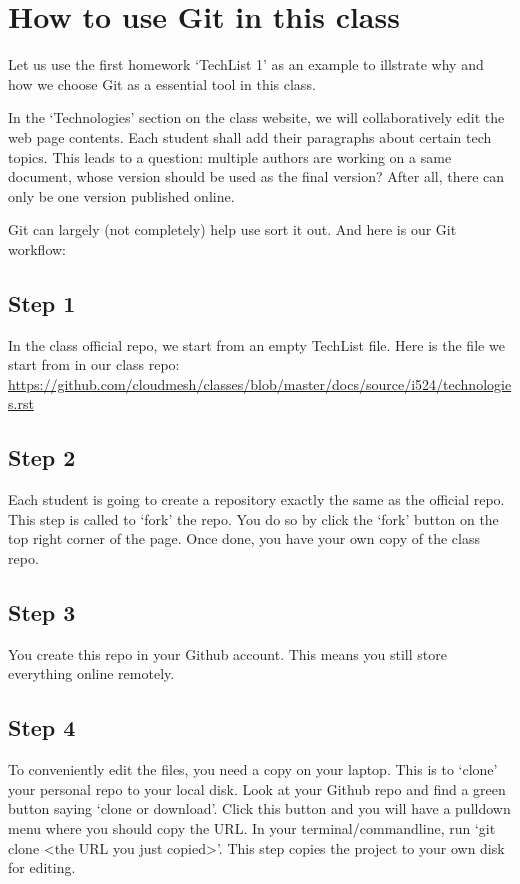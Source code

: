 \section{How to use Git in this class}\label{how-to-use-git-in-this-class}

Let us use the first homework `TechList 1' as an example to illstrate
why and how we choose Git as a essential tool in this class.

In the `Technologies' section on the class website, we will
collaboratively edit the web page contents. Each student shall add their
paragraphs about certain tech topics. This leads to a question: multiple
authors are working on a same document, whose version should be used as
the final version? After all, there can only be one version published
online.

Git can largely (not completely) help use sort it out. And here is our
Git workflow:

\subsection{Step 1}\label{step-1}

In the class official repo, we start from an empty TechList file. Here
is the file we start from in our class repo:
\url{https://github.com/cloudmesh/classes/blob/master/docs/source/i524/technologies.rst}

\subsection{Step 2}\label{step-2}

Each student is going to create a repository exactly the same as the
official repo. This step is called to `fork' the repo. You do so by
click the `fork' button on the top right corner of the page. Once done,
you have your own copy of the class repo.

\subsection{Step 3}\label{step-3}

You create this repo in your Github account. This means you still store
everything online remotely.

\subsection{Step 4}\label{step-4}

To conveniently edit the files, you need a copy on your laptop. This is
to `clone' your personal repo to your local disk. Look at your Github
repo and find a green button saying `clone or download'. Click this
button and you will have a pulldown menu where you should copy the URL.
In your terminal/commandline, run `git clone \textless{}the URL you just
copied\textgreater{}'. This step copies the project to your own disk for
editing.

